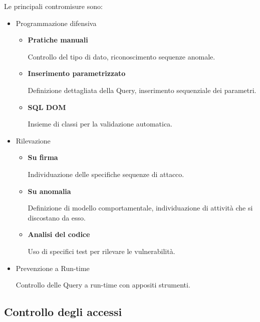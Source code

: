 \documentclass{article}
\begin{document}
\noindent Le principali contromisure sono:
\begin{itemize}
    \item Programmazione difensiva
            \begin{itemize}
                \item \textbf{Pratiche manuali}

                    Controllo del tipo di dato, riconoscimento sequenze anomale.
                
                \item \textbf{Inserimento parametrizzato}

                    Definizione dettagliata della Query, inserimento sequenziale dei parametri. 
                
                \item \textbf{SQL DOM}

                    Insieme di classi per la validazione automatica.
                
            \end{itemize}
    \item Rilevazione
        \begin{itemize}
            \item \textbf{Su firma}

                Individuazione delle specifiche sequenze di attacco.
            
            \item \textbf{Su anomalia}

                Definizione di modello comportamentale, individuazione di attività che si discostano da esso.
            
            \item \textbf{Analisi del codice}

                Uso di specifici test per rilevare le vulnerabilità.
            
        \end{itemize}
    \item Prevenzione a Run-time

        Controllo delle Query a run-time con appositi strumenti.
    
\end{itemize}

\subsection{Controllo degli accessi}
\end{document}
